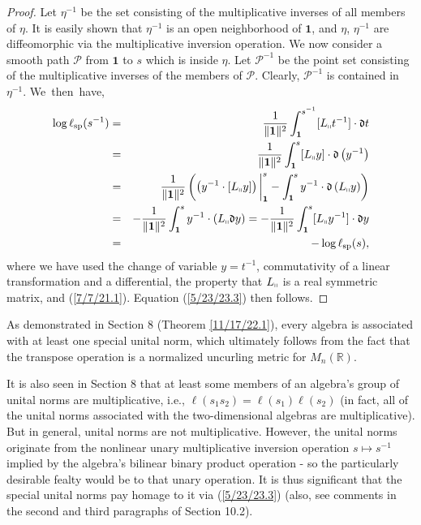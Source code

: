 \documentclass{amsart}
\numberwithin{equation}{section}
\theoremstyle{definition}
\numberwithin{theorem}{section}
\begin{document}
\begin{proof}
Let $\eta^{-1}$ be the set consisting of the multiplicative inverses of all members of $\eta$.  It is easily shown that $\eta^{-1}$ is an open neighborhood of $\mathbf{1}$, and $\eta$, $\eta^{-1}$ are diffeomorphic via the multiplicative inversion operation.  
We now consider a smooth path $\mathcal{P}$ from $\mathbf{1}$ to $s$ which is inside $\eta$.  Let $\mathcal{P}^{-1}$ be the point set consisting of the multiplicative inverses of the members of $\mathcal{P}$.  Clearly, $\mathcal{P}^{-1}$ is contained in $\eta^{-1}$. 
\mbox{We then have,} \begin{eqnarray}  \log \ell_{\rm sp}(s^{-1})   &=&   \frac{1}{\|{\bf 1}\|^2} \int_{\bf 1}^{s^{-1}} [L_{\shortparallel}t^{-1}] \cdot \mathfrak{d}t \nonumber \\ &=&  \frac{1}{\|{\bf 1}\|^2} \int_{\bf 1}^s [L_{\shortparallel}y]\cdot \mathfrak{d}\left(y^{-1}\right) \nonumber \\ &=&  \frac{1}{\|{\bf 1}\|^2}\left(\left(y^{-1}\cdot [L_{\shortparallel}y]\right)\bigg|_{\bf 1}^s - \int_{\bf 1}^s y^{-1}\cdot \mathfrak{d}\left(L_{\shortparallel}y\right)\right)   \nonumber \\ &=& -\frac{1}{\|{\bf 1}\|^2} \int_{\bf 1}^s y^{-1}\cdot (L_{\shortparallel}\mathfrak{d}y) = -\frac{1}{\|{\bf 1}\|^2} \int_{\bf 1}^s [L_{\shortparallel}y^{-1}] \cdot \mathfrak{d}y  \nonumber \\ &=& -\log \ell_{\rm sp}(s),\label{4/2/23.5} \end{eqnarray} where we have used the change of variable $y=t^{-1}$, commutativity of a linear transformation and a differential, the property that $L_{\shortparallel}$ is a real symmetric matrix, and  (\ref{7/7/21.1}).  Equation (\ref{5/23/23.3}) then follows.
\end{proof}

As demonstrated in Section 8 (Theorem \ref{11/17/22.1}), every algebra is associated with at least one special unital norm, which ultimately follows from the fact that the transpose operation is a normalized uncurling metric for $M_n(\mathbb{R})$.

It is also seen in Section 8 that at least some members of an algebra's group of unital norms are multiplicative, i.e., $\ell(s_1s_2) = \ell(s_1)\ell(s_2)$ (in fact, all of the unital norms associated with the two-dimensional algebras are multiplicative).   But in general, unital norms are not multiplicative.  However, the unital norms originate from the nonlinear unary multiplicative inversion operation $s\mapsto s^{-1}$ implied by the algebra's bilinear binary product operation - so the particularly desirable fealty would be to that unary operation.  It is thus significant that the special unital norms pay homage to it via (\ref{5/23/23.3}) (also, see comments in the second and third paragraphs of Section 10.2).
\end{document}
